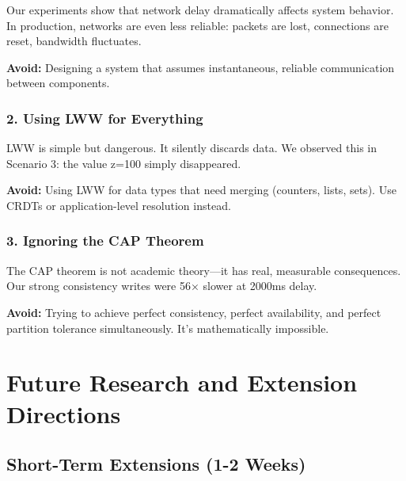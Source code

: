 \documentclass[10pt,a4paper]{article}
\begin{document}
Our experiments show that network delay dramatically affects system behavior. In production, networks are even less reliable: packets are lost, connections are reset, bandwidth fluctuates.

\textbf{Avoid:} Designing a system that assumes instantaneous, reliable communication between components.

\subsubsection{2. Using LWW for Everything}

LWW is simple but dangerous. It silently discards data. We observed this in Scenario 3: the value z=100 simply disappeared.

\textbf{Avoid:} Using LWW for data types that need merging (counters, lists, sets). Use CRDTs or application-level resolution instead.

\subsubsection{3. Ignoring the CAP Theorem}

The CAP theorem is not academic theory---it has real, measurable consequences. Our strong consistency writes were 56× slower at 2000ms delay.

\textbf{Avoid:} Trying to achieve perfect consistency, perfect availability, and perfect partition tolerance simultaneously. It's mathematically impossible.

\newpage

\section{Future Research and Extension Directions}

\subsection{Short-Term Extensions (1-2 Weeks)}
\end{document}
